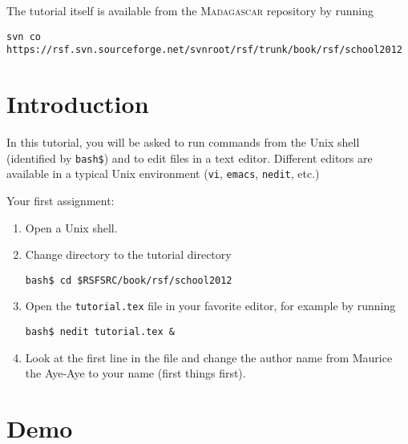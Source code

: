 The tutorial itself is available from the \textsc{Madagascar} repository
by running
\begin{verbatim}
svn co https://rsf.svn.sourceforge.net/svnroot/rsf/trunk/book/rsf/school2012
\end{verbatim}
\section{Introduction}

In this tutorial, you will be asked to run commands from the Unix
shell (identified by \texttt{bash\$}) and to edit files in a text
editor. Different editors are available in a typical Unix environment
(\texttt{vi}, \texttt{emacs}, \texttt{nedit}, etc.)

Your first assignment:
\begin{enumerate}
\item Open a Unix shell.
\item Change directory to the tutorial directory
\begin{verbatim}
bash$ cd $RSFSRC/book/rsf/school2012
\end{verbatim}
\item Open the \texttt{tutorial.tex} file in your favorite editor, for example by
running
\begin{verbatim}
bash$ nedit tutorial.tex & 
\end{verbatim}
\item Look at the first line in the file and change the author name from Maurice the Aye-Aye to your name (first things first). 
\end{enumerate}

\section{Demo}
